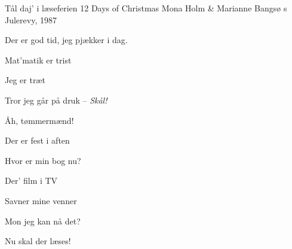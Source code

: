 \begin{song}{Tål daj' i læseferien}
  {} %
  {12 Days of Christmas} %
  {Mona Holm \& Marianne Bangsø} %
  {\TKET{}s Julerevy, 1987} %
  {\NotCCLIed} %

  \let\oldSBVerseCnt\theSBVerseCnt

  \renewcommand{\theSBVerseCnt}{$\texttt{l[\oldSBVerseCnt]}$}
  \begin{SBVerse}
    Der er god tid, jeg pjækker i dag.
  \end{SBVerse}

  \begin{SBVerse}
    Mat’matik er trist
  \end{SBVerse}

  \begin{SBVerse}
    Jeg er træt
  \end{SBVerse}

  \begin{SBVerse}
    Tror jeg går på druk -- \emph{Skål!}
  \end{SBVerse}

  \begin{SBVerse}
    Åh, tømmermænd!
  \end{SBVerse}

  \begin{SBVerse}
    Der er fest i aften
  \end{SBVerse}

  \begin{SBVerse}
    Hvor er min bog nu?
  \end{SBVerse}

  \begin{SBVerse}
    Der' film i TV
  \end{SBVerse}

  \begin{SBVerse}
    Savner mine venner
  \end{SBVerse}

  \begin{SBVerse}
    Mon jeg kan nå det?
  \end{SBVerse}

  \begin{SBVerse}
    Nu skal der læses!
  \end{SBVerse}


\end{song}

